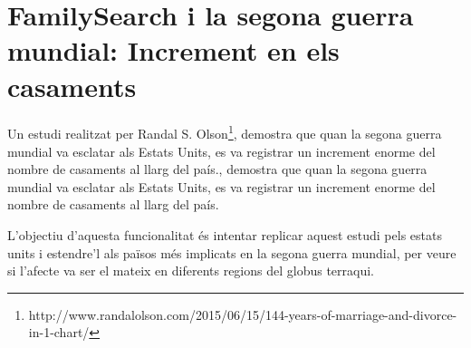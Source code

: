 \section{FamilySearch i la segona guerra mundial: Increment en els casaments}

    \paragraph{}
    Un estudi realitzat per Randal S. Olson\footnote{http://www.randalolson.com/2015/06/15/144-years-of-marriage-and-divorce-in-1-chart/}, demostra que quan la segona guerra mundial va esclatar als Estats Units, es va registrar un increment enorme del nombre de casaments al llarg del país., demostra que quan la segona guerra mundial va esclatar als Estats Units, es va registrar un increment enorme del nombre de casaments al llarg del país.

    L'objectiu d'aquesta funcionalitat és intentar replicar aquest estudi pels estats units i estendre'l als països més implicats en la segona guerra mundial, per veure si l'afecte va ser el mateix en diferents regions del globus terraqui.

